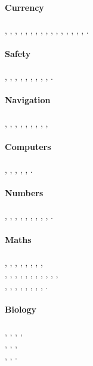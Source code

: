 \documentclass{article}
\begin{document}
\paragraph{Currency}
\EUR,
\EURdig,
\EurDig,
\EURhv,
\EurHv,
\EURcr,
\EurCr,
\EURtm,
\EurTm,
\Ecommerce,
\EstimatedSign,
\Shilling,
\Denarius,
\Deleatur,
\Pfund,
\EyesDollar,
\Florin.

\paragraph{Safety}
\Stopsign,
\CESign,
\CEsign,
\Estatically,
\Explosionsafe,
\Laserbeam,
\Biohazard,
\Radioactivity,
\BSEFree,
\BSEfree.

\paragraph{Navigation}
\RewindToIndex,
\RewindToStart,
\Rewind,
\Forward,
\ForwardToEnd,
\ForwardToIndex,
\MoveUp,
\MoveDown,
\ToTop,
\ToBottom

\paragraph{Computers}
\ComputerMouse,
\SerialInterface,
\Keyboard,
\SerialPort,
\ParallelPort,
\Printer.

\paragraph{Numbers}
\MVZero,
\MVOne,
\MVTwo,
\MVThree,
\MVFour,
\MVFive,
\MVSix,
\MVSeven,
\MVEight,
\MVNine.

\paragraph{Maths}
\MVLeftBracket,
\MVRightBracket,
\MVComma,
\MVPeriod,
\MVMinus,
\MVPlus,
\MVDivision,
\MVMultiplication,
\\
\Conclusion,
\Equivalence,
\barOver,
\BarOver,
\arrowOver,
\Vectorarrow,
\ArrowOver,
\Vectorarrowhigh,
\StrikingThrough,
\MultiplicationDot,
\Squaredot,
\\
\LessOrEqual,
\LargerOrEqual,
\AngleSign,
\Anglesign,
\Corresponds,
\Congruent,
\NotCongruent,
\Divides,
\DividesNot.

\paragraph{Biology}
\Female,
\Male,
\Hermaphrodite,
\Neutral,
\\
\FEMALE,
\MALE,
\HERMAPHRODITE,
\\
\FemaleFemale,
\MaleMale,
\FemaleMale.
\end{document}

